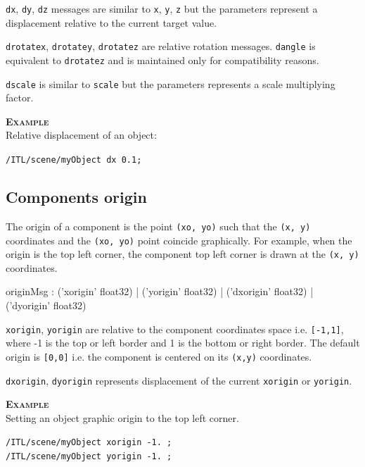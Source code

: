\documentclass[a4paper,twoside]{report}
\newcommand{\subsublevel}[1]	{\subsection{#1}}
\newcommand{\OSC}[1]		{\texttt{#1}}
\newcommand{\values}[1]		{\texttt{#1}}
\newcommand{\example}		{\textbf{\hspace{-1.5cm}\textbf{\textsc{Example }}}}
\let\olditemize\itemize
\let\oldenditemize\enditemize
\renewenvironment{itemize} 	{\olditemize \setlength{\itemsep}{1mm}}{\oldenditemize}
\newcommand{\sample}	[1]			{\vspace{-2mm}\begin{center}\colorbox{mygrey}{
								\begin{minipage}[t]{0.9\columnwidth} 
								{\small \texttt{#1}}
								\end{minipage}}\end{center}}
\begin{document}
\begin{itemize}
\item \OSC{dx}, \OSC{dy}, \OSC{dz} messages are similar to \OSC{x}, \OSC{y}, \OSC{z} but the parameters represent a displacement relative to the current target value.
\item \OSC{drotatex}, \OSC{drotatey}, \OSC{drotatez} are relative rotation messages. \OSC{dangle} is equivalent to \OSC{drotatez} and is maintained only for compatibility reasons.
\item \OSC{dscale} is similar to \OSC{scale} but the parameters represents a scale multiplying factor.
\end{itemize}

\example \\
Relative displacement of an object:
\sample{/ITL/scene/myObject dx 0.1;}

\subsublevel{Components origin}
\label{origin}

The origin of a component is the point \values{(xo, yo)} such that the \values{(x, y)} coordinates and the \values{(xo, yo)} point coincide graphically. For example, when the origin is the top left corner, the component top left corner is drawn  at the \values{(x, y)} coordinates.

\begin{rail}
originMsg :  
			('xorigin' float32)
		| 	('yorigin' float32)
		| 	('dxorigin' float32)
		| 	('dyorigin' float32)
\end{rail}

\begin{itemize}
\item \OSC{xorigin}, \OSC{yorigin} are relative to the component coordinates space i.e. \values{[-1,1]}, where -1 is the top or left border and 1 is the bottom or right border. The default origin is \values{[0,0]} i.e. the component is centered on its \values{(x,y)} coordinates.
\item \OSC{dxorigin}, \OSC{dyorigin} represents displacement of the current \OSC{xorigin} or \OSC{yorigin}.
\end{itemize}

\example \\
Setting an object graphic origin to the top left corner.
\sample{/ITL/scene/myObject xorigin -1. ;\\
/ITL/scene/myObject yorigin -1. ;
}
\end{document}
